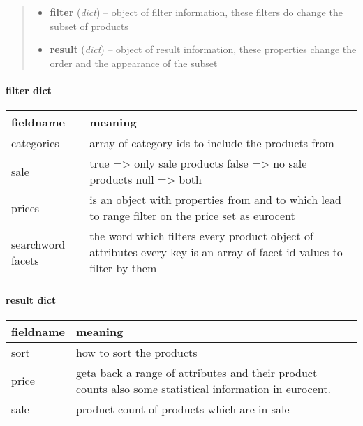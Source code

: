 \documentclass[letterpaper,10pt,english]{sphinxmanual}
\begin{document}
\begin{fulllineitems}
\begin{fulllineitems}
\begin{quote}
\begin{description}
\begin{itemize}
\item {} 
\textbf{filter} (\emph{dict}) -- object of filter information, these filters do 
change the subset of products

\item {} 
\textbf{result} (\emph{dict}) -- object of result information, these properties 
change the order and the appearance of the subset

\end{itemize}

\end{description}\end{quote}
\paragraph{filter dict}

\begin{tabulary}{\linewidth}{|L|L|}
\hline
\textsf{\relax 
fieldname
} & \textsf{\relax 
meaning
}\\
\hline
categories
 & 
array of category ids to include the products from
\\

sale
 & 
true =\textgreater{} only sale products
false =\textgreater{} no sale products
null =\textgreater{} both
\\

prices
 & 
is an object with properties from and to which lead to
range filter on the price set as eurocent
\\

searchword
facets
 & 
the word which filters every product
object of attributes every key is an array of facet id
values to filter by them
\\
\hline\end{tabulary}

\paragraph{result dict}

\begin{tabulary}{\linewidth}{|L|L|}
\hline
\textsf{\relax 
fieldname
} & \textsf{\relax 
meaning
}\\
\hline
sort
 & 
how to sort the products
\\

price
 & 
geta back a range of attributes and their product counts
also some statistical information in eurocent.
\\

sale
 & 
product count of products which are in sale
\\


\end{tabulary}
\end{fulllineitems}
\end{fulllineitems}
\end{document}
